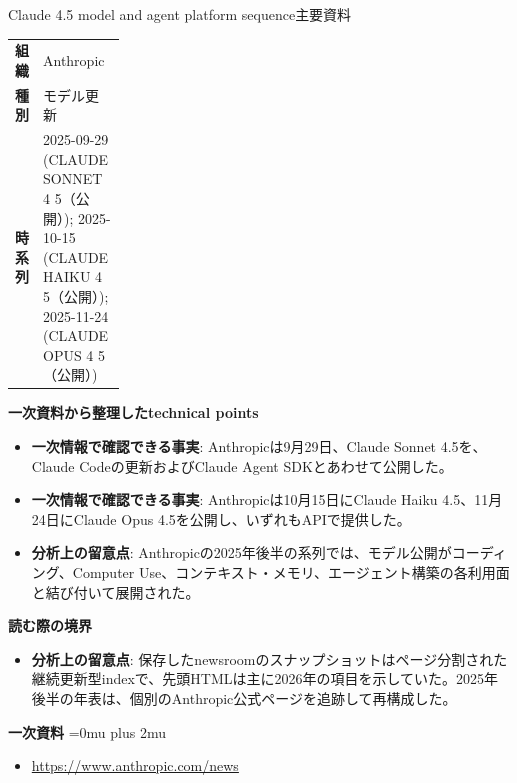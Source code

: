 \begin{technicalnote}{Claude 4.5 model and agent platform sequence}{主要資料}
\begingroup
\begin{tabularx}{\linewidth}{@{}>{\bfseries}p{0.22\linewidth}X@{}}
組織 & Anthropic \\
種別 & モデル更新 \\
時系列 & 2025-09-29 (CLAUDE SONNET 4 5（公開）); 2025-10-15 (CLAUDE HAIKU 4 5（公開）); 2025-11-24 (CLAUDE OPUS 4 5（公開）) \\
\end{tabularx}
\smallskip
{\bfseries 一次資料から整理したtechnical points}
\begin{itemize}[leftmargin=1.5em,itemsep=0.35em]
\item \textbf{一次情報で確認できる事実}: Anthropicは9月29日、Claude Sonnet 4.5を、Claude Codeの更新およびClaude Agent SDKとあわせて公開した。
\item \textbf{一次情報で確認できる事実}: Anthropicは10月15日にClaude Haiku 4.5、11月24日にClaude Opus 4.5を公開し、いずれもAPIで提供した。
\item \textbf{分析上の留意点}: Anthropicの2025年後半の系列では、モデル公開がコーディング、Computer Use、コンテキスト・メモリ、エージェント構築の各利用面と結び付いて展開された。
\end{itemize}
\begin{minipage}{\linewidth}
{\bfseries 読む際の境界}
\begin{itemize}[leftmargin=1.5em,itemsep=0.35em]
\item \textbf{分析上の留意点}: 保存したnewsroomのスナップショットはページ分割された継続更新型indexで、先頭HTMLは主に2026年の項目を示していた。2025年後半の年表は、個別のAnthropic公式ページを追跡して再構成した。
\end{itemize}
\begin{samepage}
{\bfseries 一次資料}
\begingroup\sloppy
\Urlmuskip=0mu plus 2mu\relax
\begin{itemize}[leftmargin=1.5em,itemsep=0.25em]
\item {\scriptsize\url{https://www.anthropic.com/news}}
\end{itemize}
\endgroup
\end{samepage}
\end{minipage}
\endgroup
\end{technicalnote}
\medskip

